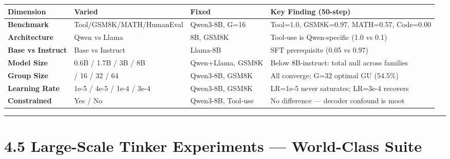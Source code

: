 \documentclass[
  american,
  11pt,
  a4paper,
  oneside]{report}
\newcounter{none} %
\begin{document}
{\def\LTcaptype{none} %
\begin{longtable}[]{@{}
  >{\raggedright\arraybackslash}p{}
  >{\raggedright\arraybackslash}p{}
  >{\raggedright\arraybackslash}p{}
  >{\raggedright\arraybackslash}p{}@{}}
\toprule\noalign{}
\begin{minipage}[b]{\linewidth}\raggedright
Dimension
\end{minipage} & \begin{minipage}[b]{\linewidth}\raggedright
Varied
\end{minipage} & \begin{minipage}[b]{\linewidth}\raggedright
Fixed
\end{minipage} & \begin{minipage}[b]{\linewidth}\raggedright
Key Finding (50-step)
\end{minipage} \\
\midrule\noalign{}
\endhead
\bottomrule\noalign{}
\endlastfoot
\textbf{Benchmark} & Tool/GSM8K/MATH/HumanEval & Qwen3-8B, G=16 &
Tool=1.0, GSM8K=0.97, MATH=0.57, Code=0.00 \\
\textbf{Architecture} & Qwen vs Llama & 8B, GSM8K & Tool-use is
Qwen-specific (1.0 vs 0.1) \\
\textbf{Base vs Instruct} & Base vs Instruct & Llama-8B & SFT
prerequisite (0.05 vs 0.97) \\
\textbf{Model Size} & 0.6B / 1.7B / 3B / 8B & Qwen+Llama, GSM8K & Below
8B-instruct: total null across families \\
\textbf{Group Size} & 4 / 16 / 32 / 64 & Qwen3-8B, GSM8K & All converge;
G=32 optimal GU (54.5\%) \\
\textbf{Learning Rate} & 1e-5 / 4e-5 / 1e-4 / 3e-4 & Qwen3-8B, GSM8K &
LR=1e-5 never saturates; LR=3e-4 recovers \\
\textbf{Constrained} & Yes / No & Qwen3-8B, Tool-use & No difference ---
decoder confound is moot \\
\end{longtable}
}

\begin{center}\rule{0.5\linewidth}{0.5pt}\end{center}

\section{4.5 Large-Scale Tinker Experiments --- World-Class
Suite}\label{large-scale-tinker-experiments-world-class-suite}
\end{document}
